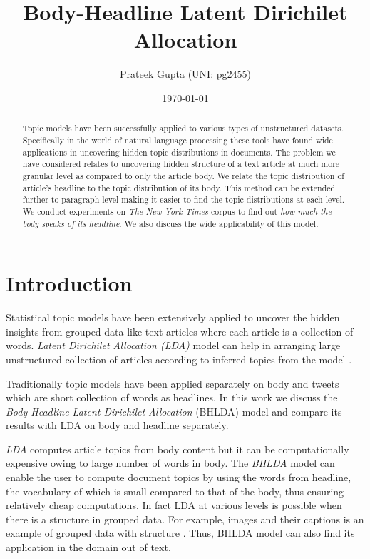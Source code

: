 \documentclass[a4paper]{article}
\title{Body-Headline Latent Dirichilet Allocation}
\author{Prateek Gupta (UNI: pg2455)}
\date{\today}
\begin{document}
\maketitle

\begin{abstract}
Topic models have been successfully applied to various types of unstructured datasets. Specifically in the world of natural language processing these tools have found wide applications in uncovering hidden topic distributions in documents. The problem we have considered relates to uncovering hidden structure of a text article at much more granular level as compared to only the article body. We relate the topic distribution of article's headline to the topic distribution of its body. This method can be extended further to paragraph level making it easier to find the topic distributions at each level. We conduct experiments on \textit{The New York Times} corpus to find out \textit{how much the body speaks of its headline}. We also discuss the wide applicability of this model.
\end{abstract}

\section{Introduction}
Statistical topic models have been extensively applied to uncover the hidden insights from grouped data like text articles where each article is a collection of words. \emph{Latent Dirichilet Allocation (LDA)} model can help in arranging large unstructured collection of articles according to inferred topics from the model \cite{blei_prob_model_paper}. 

Traditionally topic models have been applied separately on body\cite{blei_prob_model_paper, lda_blei} and tweets\cite{tm_lda} which are short collection of words as headlines. In this work we discuss  the \emph{Body-Headline Latent Dirichilet Allocation} (BHLDA) model and compare its results with LDA on body and headline separately.

\emph{LDA} computes article topics from body content but it can be  computationally expensive owing to large number of words in body. The \emph{BHLDA} model can enable the user to compute document topics by using the words from headline, the vocabulary of which is small compared to that of the body, thus ensuring relatively cheap computations. In fact LDA at various levels is possible when there is a structure in grouped data. For example, images and their captions is an example of grouped data with structure \cite{model_annotated_data}. Thus, BHLDA model can also find its application in the domain out of text.
\end{document}
